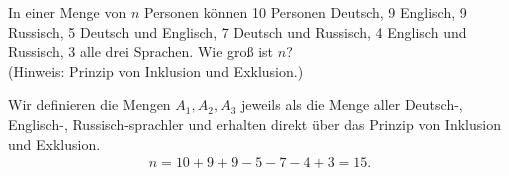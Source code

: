 
\begin{exercise}

In einer Menge von $n$ Personen können 10 Personen Deutsch, 9 Englisch, 9 Russisch,
5 Deutsch und Englisch, 7 Deutsch und Russisch, 4 Englisch und Russisch, 3 alle drei
Sprachen. Wie groß ist $n$? \\
(Hinweis: Prinzip von Inklusion und Exklusion.)

\end{exercise}


\begin{solution}
Wir definieren die Mengen $A_1,A_2,A_3$ jeweils als die Menge aller Deutsch-,
Englisch-, Russisch-sprachler und erhalten direkt über das Prinzip von Inklusion und Exklusion.
\begin{align*}
  n = 10 + 9 + 9 - 5 - 7 - 4 + 3 = 15.
\end{align*}

\end{solution}

